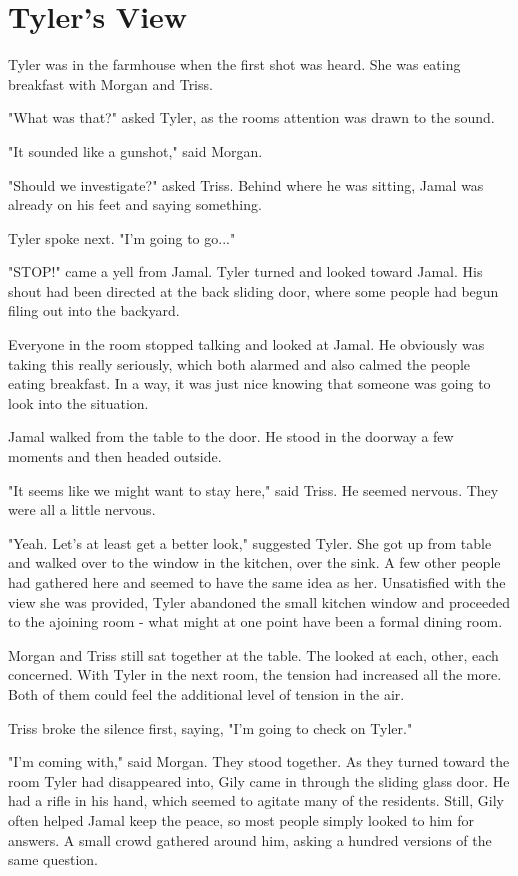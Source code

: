 \documentclass[courier]{sffms}
\begin{document}
\chapter{Tyler's View}
Tyler was in the farmhouse when the first shot
was heard. She was eating breakfast with Morgan
and Triss.

"What was that?" asked Tyler, as the rooms attention
was drawn to the sound.

"It sounded like a gunshot," said Morgan.

"Should we investigate?" asked Triss. Behind where
he was sitting, Jamal was already on his feet and
saying something.

Tyler spoke next. "I'm going to go..."

"STOP!" came a yell from Jamal. Tyler turned and
looked toward Jamal. His shout had been directed
at the back sliding door, where some people had
begun filing out into the backyard.

Everyone in the room stopped talking
and looked at Jamal. He obviously was
taking this really seriously, which both
alarmed and also calmed the people
eating breakfast. In a way, it was just nice
knowing that someone was going to look
into the situation.

Jamal walked from the table to the door.
He stood in the doorway a few moments
and then headed outside.

"It seems like we might want to stay here,"
said Triss. He seemed nervous. They were
all a little nervous.

"Yeah. Let's at least get a better look,"
suggested Tyler. She got up from table and
walked over to the window in the kitchen,
over the sink. A few other people had gathered
here and seemed to have the same idea as
her. Unsatisfied with the view she was provided,
Tyler abandoned the small kitchen window and
proceeded to the ajoining room - what might
at one point have been a formal dining room.

Morgan and Triss still sat together at the table.
The looked at each, other, each concerned.
With Tyler in the next room, the tension had
increased all the more. Both of them could
feel the additional level of tension in the air.

Triss broke the silence first, saying, "I'm going
to check on Tyler."

"I'm coming with," said Morgan. They stood together.
As they turned toward the room Tyler had
disappeared into, Gily came in through the
sliding glass door. He had a rifle in his hand,
which seemed to agitate many of the residents.
Still, Gily often helped Jamal keep the peace,
so most people simply looked to him for answers.
A small crowd gathered around him, asking
a hundred versions of the same question.
\end{document}
